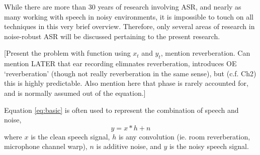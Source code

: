 \documentclass[dissertation,copyright]{uathesis}
\begin{document}
% 

While there are more than 30 years of research involving ASR, and nearly as many working with speech in noisy environments, it is impossible to touch on all techniques in this very brief overview.  Therefore, only several areas of research in noise-robust ASR will be discussed pertaining to the present research.

[Present the problem with function using $x_\textit{t}$ and $y_\textit{t}$, mention reverberation.  Can mention LATER that ear recording elimnates reverberation, introduces OE `reverberation' (though not really reverberation in the same sense), but (c.f. Ch2) this is highly predictable.  Also mention here that phase is rarely accounted for, and is normally assumed out of the equation.]

Equation \ref{eq:basic} is often used to represent the combination of speech and noise,
\begin{equation}\label{eq:basic}
y = x * h + n
\end{equation}
where $x$ is the clean speech signal, $h$ is any convolution (ie. room reverberation, microphone channel warp), $n$ is additive noise, and $y$ is the noisy speech signal.
\end{document}
